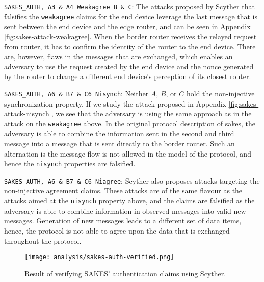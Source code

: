 \begin{list}{•}{}

\item \texttt{SAKES\_AUTH, A3 \& A4 Weakagree B \& C}: The attacks proposed by Scyther that falsifies the \texttt{weakagree} claims for the end device leverage the last message that is sent between the end device and the edge router, and can be seen in Appendix \ref{fig:sakes-attack-weakagree}. When the border router receives the relayed request from router, it has to confirm the identity of the router to the end device. There are, however, flaws in the messages that are exchanged, which enables an adversary to use the request created by the end device and the nonce generated by the router to change a different end device's perception of its closest router.

\item \texttt{SAKES\_AUTH, A6 \& B7 \& C6 Nisynch}: Neither $A$, $B$, or $C$ hold the non-injective synchronization property. If we study the attack proposed in Appendix \ref{fig:sakes-attack-nisynch}, we see that the adversary is using the same approach as in the attack on the \texttt{weakagree} above. In the original protocol description of \gls{sakes}, the adversary is able to combine the information sent in the second and third message into a message that is sent directly to the border router. Such an alternation is the message flow is not allowed in the model of the protocol, and hence the \texttt{nisynch} properties are falsified.

\item \texttt{SAKES\_AUTH, A6 \& B7 \& C6 Niagree}: Scyther also proposes attacks targeting the non-injective agreement claims. These attacks are of the same flavour as the attacks aimed at the \texttt{nisynch} property above, and the claims are falsified as the adversary is able to combine information in observed messages into valid new messages. Generation of new messages leads to a different set of data items, hence, the protocol is not able to agree upon the data that is exchanged throughout the protocol.

\end{list}

\begin{figure}[h]
	\centering
	\texttt{[image: analysis/sakes-auth-verified.png]}
	\caption{Result of verifying SAKES' authentication claims using Scyther.}
	\label{fig:sakes-verified-auth}
\end{figure}

\newpage

